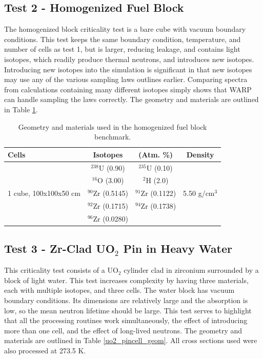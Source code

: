 \documentclass[preprint,12pt]{elsarticle}
\begin{document}
\subsection{Test 2 - Homogenized Fuel Block}

The homogenized block criticality test is a bare cube with vacuum boundary conditions.  This test keeps the same boundary condition, temperature, and number of cells as test 1, but is larger, reducing leakage, and contains light isotopes, which readily produce thermal neutrons, and introduces new isotopes.  Introducing new isotopes into the simulation is significant in that new isotopes may use any of the various sampling laws outlines earlier.  Comparing spectra from calculations containing many different isotopes simply shows that WARP can handle sampling the laws correctly.  The geometry and materials are outlined in Table \ref{homfuel_geom}.  

\begin{table}[h]
\centering
\caption{Geometry and materials used in the homogenized fuel block benchmark.}
\label{homfuel_geom}
\begin{tabular}{| l | c  c | c |}
\hline
Cells & Isotopes & (Atm. \%)& Density \\
\hline
\multirow{5}{*}{1 cube, 100x100x50 cm }            &   $^{238}$U   (0.90)   &  $^{235}$U   (0.10)   &  \multirow{5}{*}{5.50 g/cm$^3$} \\
                                                   &   $^{16}$O    (3.00)   &  $^{2}$H     (2.0)    &  \\
                                                   &   $^{90}$Zr   (0.5145) &  $^{91}$Zr   (0.1122) &  \\
                                                   &   $^{92}$Zr   (0.1715) &  $^{94}$Zr   (0.1738) &  \\
                                                   &   $^{96}$Zr   (0.0280) &                       &  \\
\hline
\end{tabular}
\end{table}



\subsection{Test 3 - Zr-Clad UO$_2$ Pin in Heavy Water}

This criticality test consists of a UO$_2$ cylinder clad in zirconium surrounded by a block of light water.  This test increases complexity by having three materials, each with multiple isotopes, and three cells.  The water block has vacuum boundary conditions.  Its dimensions are relatively large and the absorption is low, so the mean neutron lifetime should be large.  This test serves to highlight that all the processing routines work simultaneously, the effect of introducing more than one cell, and the effect of long-lived neutrons.  The geometry and materials are outlined in Table \ref{uo2_pincell_geom}.  All cross sections used were also processed at 273.5 K.
\end{document}
